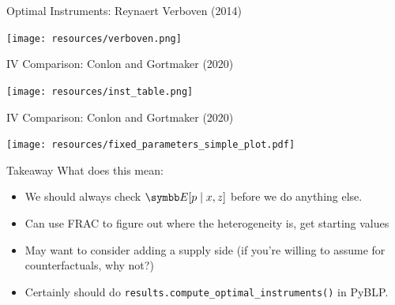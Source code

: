 \documentclass[aspectratio=169,10pt]{beamer}
\begin{document}
\begin{frame}{Optimal Instruments: Reynaert Verboven (2014)}
\begin{center}
\texttt{[image: resources/verboven.png]}
\end{center}
\end{frame}




\begin{frame}{IV Comparison: Conlon and Gortmaker (2020)}
\begin{center}
\texttt{[image: resources/inst\_table.png]}
\end{center}
\end{frame}

\begin{frame}{IV Comparison: Conlon and Gortmaker (2020)}
\begin{center}
\texttt{[image: resources/fixed\_parameters\_simple\_plot.pdf]}
\end{center}
\end{frame}



\begin{frame}{Takeaway}
What does this mean:
\begin{itemize}
    \item We should always check $\E[p \mid x, z]$ before we do anything else.
    \item Can use FRAC to figure out where the heterogeneity is, get starting values
    \item May want to consider adding a supply side (if you're willing to assume for counterfactuals, why not?)
    \item Certainly should do \texttt{results.compute\_optimal\_instruments()} in PyBLP.
\end{itemize}
\end{frame}
\end{document}
